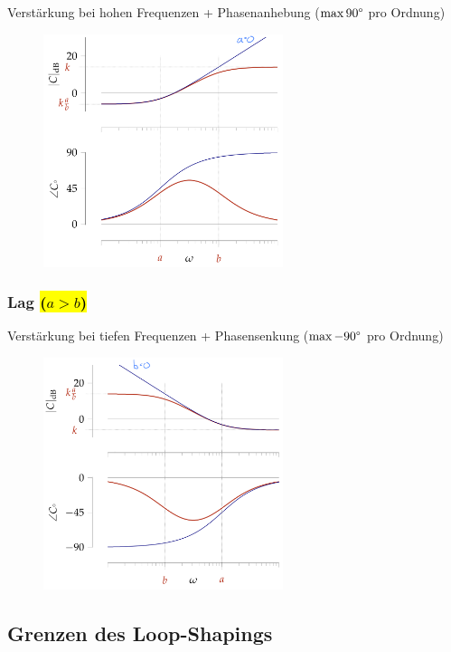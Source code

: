 \documentclass[
  10pt,
  a4paper,
  twocolumn]{article}
\numberwithin{equation}{section}
\begin{document}
Verstärkung bei hohen Frequenzen + Phasenanhebung (\(\max 90\degree\)
pro Ordnung)

\begin{figure}[H]

{\centering \includegraphics[width=7cm,height=\textheight]{images/paste-79.png}

}

\end{figure}

\hypertarget{lag}{%
\subsubsection{\texorpdfstring{Lag \hl{($a > b$)}}{Lag }}\label{lag}}

Verstärkung bei tiefen Frequenzen + Phasensenkung (\(\max -90\degree\)
pro Ordnung)

\begin{figure}[H]

{\centering \includegraphics[width=7cm,height=\textheight]{images/paste-80.png}

}

\end{figure}

\hypertarget{grenzen-des-loop-shapings}{%
\subsection{Grenzen des Loop-Shapings}\label{grenzen-des-loop-shapings}}
\end{document}
